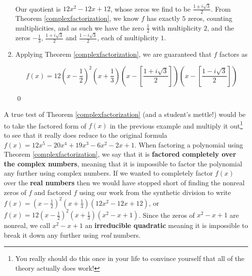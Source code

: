 \begin{ex}
\begin{enumerate}
\[\begin{array}{rrrrrrr}
\end{array}\]

Our quotient is $12x^2 - 12x + 12$, whose zeros we find to be $\frac{1 \pm i \sqrt{3}}{2}$.  From Theorem \ref{complexfactorization}, we know $f$ has exactly $5$ zeros, counting multiplicities, and as such we have the zero $\frac{1}{2}$ with multiplicity $2$, and the zeros $-\frac{1}{3}$, $\frac{1 + i \sqrt{3}}{2}$ and $\frac{1 - i \sqrt{3}}{2}$, each of multiplicity $1$.

\item  Applying Theorem \ref{complexfactorization}, we are guaranteed that $f$ factors as

\[f(x) = 12 \left(x- \dfrac{1}{2}\right)^2 \left(x + \dfrac{1}{3}\right) \left(x - \left[\dfrac{1 + i \sqrt{3}}{2}\right]\right) \left(x - \left[\dfrac{1 - i \sqrt{3}}{2}\right]\right)\]

\vspace{-.4in} \qed

\end{enumerate}

\end{ex}

A true test of Theorem \ref{complexfactorization} (and a student's mettle!) would be to take the factored form of $f(x)$ in the previous example and multiply it out\footnote{You really should do this once in your life to convince yourself that all of the theory actually does work!} to see that it really does reduce to the original formula  $f(x) = 12x^5 - 20x^4+19x^3-6x^2-2x+1$.  When factoring a polynomial using Theorem \ref{complexfactorization}, we say that it is  \textbf{factored completely over the complex numbers}, meaning that it is impossible to factor the polynomial any further using complex numbers.  If we wanted to   completely factor $f(x)$ over the \textbf{real numbers} then we would have stopped short of finding the nonreal zeros of $f$ and factored $f$ using our work from the synthetic division to write $f(x) = \left(x - \frac{1}{2} \right)^2 \left(x + \frac{1}{3} \right)\left(12x^2 - 12x + 12\right)$, or $f(x) = 12\left(x - \frac{1}{2} \right)^2 \left(x + \frac{1}{3} \right)\left(x^2 - x + 1\right)$.  Since the zeros of $x^2-x+1$ are nonreal, we call $x^2-x+1$ an \textbf{irreducible quadratic} meaning it is impossible to break it down any further using \emph{real} numbers.  

